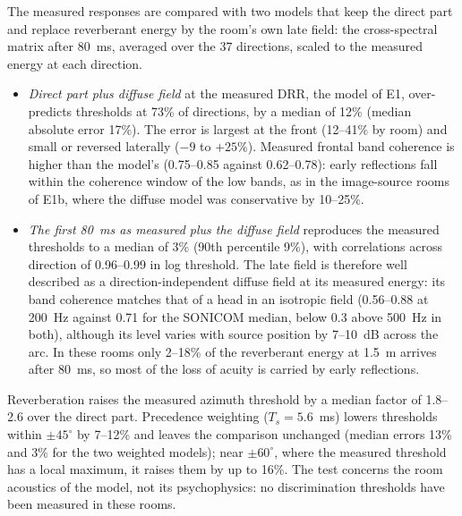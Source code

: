 \documentclass[10pt]{article}
\theoremstyle{definition}
\begin{document}
The measured responses are compared with two models that keep the direct part and replace reverberant energy by the room's own late field: the cross-spectral matrix after 80~ms, averaged over the 37 directions, scaled to the measured energy at each direction.
\begin{itemize}
\item \emph{Direct part plus diffuse field} at the measured DRR, the model of E1, over-predicts thresholds at 73\% of directions, by a median of 12\% (median absolute error 17\%). The error is largest at the front (12--41\% by room) and small or reversed laterally ($-9$ to $+25\%$). Measured frontal band coherence is higher than the model's (0.75--0.85 against 0.62--0.78): early reflections fall within the coherence window of the low bands, as in the image-source rooms of E1b, where the diffuse model was conservative by 10--25\%.
\item \emph{The first 80~ms as measured plus the diffuse field} reproduces the measured thresholds to a median of 3\% (90th percentile 9\%), with correlations across direction of 0.96--0.99 in log threshold. The late field is therefore well described as a direction-independent diffuse field at its measured energy: its band coherence matches that of a head in an isotropic field (0.56--0.88 at 200~Hz against 0.71 for the SONICOM median, below 0.3 above 500~Hz in both), although its level varies with source position by 7--10~dB across the arc. In these rooms only 2--18\% of the reverberant energy at 1.5~m arrives after 80~ms, so most of the loss of acuity is carried by early reflections.
\end{itemize}
Reverberation raises the measured azimuth threshold by a median factor of 1.8--2.6 over the direct part. Precedence weighting ($T_s=5.6$~ms) lowers thresholds within $\pm45^\circ$ by 7--12\% and leaves the comparison unchanged (median errors 13\% and 3\% for the two weighted models); near $\pm60^\circ$, where the measured threshold has a local maximum, it raises them by up to 16\%. The test concerns the room acoustics of the model, not its psychophysics: no discrimination thresholds have been measured in these rooms.
\end{document}
